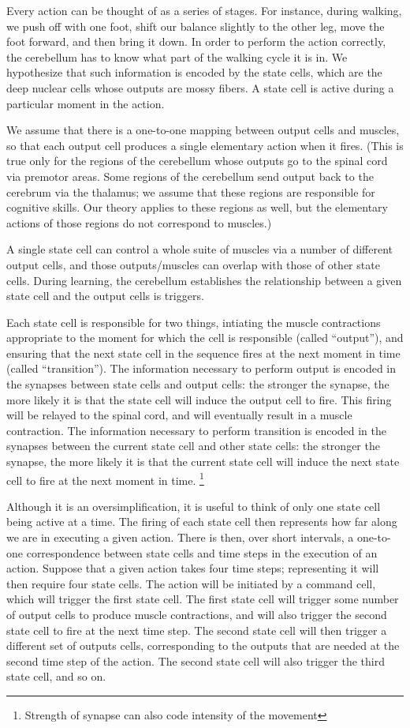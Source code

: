 \documentclass{article}
\theoremstyle{definition}
\begin{document}
Every action can be thought of as a series of stages. For instance,
during walking, we push off with one foot, shift our balance slightly
to the other leg, move the foot forward, and then bring it down. In
order to perform the action correctly, the cerebellum has to know what
part of the walking cycle it is in. We hypothesize that such
information is encoded by the state cells, which are the deep nuclear
cells whose outputs are mossy fibers. A state cell is active during a
particular moment in the action.

We assume that there is a one-to-one mapping between output cells and
muscles, so that each output cell produces a single elementary action
when it fires. (This is true only for the regions of the cerebellum
whose outputs go to the spinal cord via premotor areas. Some regions
of the cerebellum send output back to the cerebrum via the thalamus;
we assume that these regions are responsible for cognitive skills. Our
theory applies to these regions as well, but the elementary actions of
those regions do not correspond to muscles.)

A single state cell can control a whole suite of muscles via a number
of different output cells, and those outputs/muscles can overlap with
those of other state cells. During learning, the cerebellum
establishes the relationship between a given state cell and the output
cells is triggers.

Each state cell is responsible for two things, intiating the muscle
contractions appropriate to the moment for which the cell is
responsible (called ``output''), and ensuring that the next state cell
in the sequence fires at the next moment in time (called
``transition''). The information necessary to perform output is
encoded in the synapses between state cells and output cells: the
stronger the synapse, the more likely it is that the state cell will
induce the output cell to fire. This firing will be relayed to the
spinal cord, and will eventually result in a muscle contraction. The
information necessary to perform transition is encoded in the synapses
between the current state cell and other state cells: the stronger the
synapse, the more likely it is that the current state cell will induce
the next state cell to fire at the next moment in time.
\footnote{Strength of synapse can also code intensity of the movement}

Although it is an oversimplification, it is useful to think of only
one state cell being active at a time. The firing of each state cell
then represents how far along we are in executing a given
action. There is then, over short intervals, a one-to-one
correspondence between state cells and time steps in the execution of
an action. Suppose that a given action takes four time steps;
representing it will then require four state cells. The action will be
initiated by a command cell, which will trigger the first state
cell. The first state cell will trigger some number of output cells to
produce muscle contractions, and will also trigger the second state
cell to fire at the next time step. The second state cell will then
trigger a different set of outputs cells, corresponding to the outputs
that are needed at the second time step of the action. The second
state cell will also trigger the third state cell, and so on.
\end{document}
